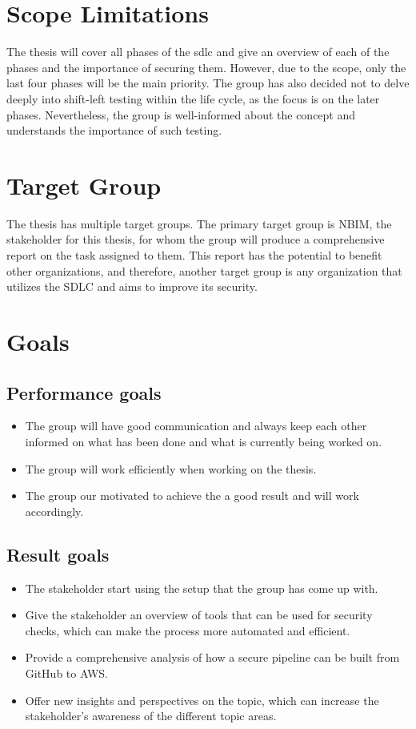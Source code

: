  
\section{Scope Limitations}
The thesis will cover all phases of the \acrlong{sdlc} and give an overview of each of the phases and the importance of securing them.  However, due to the scope, only the last four phases will be the main priority. 
The group has also decided not to delve deeply into \gls{shift-left} testing within the life cycle, as the focus is on the later phases. Nevertheless, the group is well-informed about the concept and understands the importance of such testing. 


\section{Target Group}
The thesis has multiple target groups. The primary target group is NBIM, the stakeholder for this thesis, for whom the group will produce a comprehensive report on the task assigned to them. This report has the potential to benefit other organizations, and therefore, another target group is any organization that utilizes the SDLC and aims to improve its security.

\section{Goals}
\subsection{Performance goals}
\begin{itemize}
    \item The group will have good communication and always keep each other informed on what has been done and what is currently being worked on. 
    \item The group will work efficiently when working on the thesis. 
    \item The group our motivated to achieve the a good result and will work accordingly. 
\end{itemize}

\subsection{Result goals}
\begin{itemize}
    \item The stakeholder start using the setup that the group has come up with. 
    \item Give the stakeholder an overview of tools that can be used for security checks, which can make the process more automated and efficient. 
    \item Provide a comprehensive analysis of how a secure pipeline can be built from GitHub to AWS. 
    \item Offer new insights and perspectives on the topic, which can increase the stakeholder's awareness of the different topic areas. 
\end{itemize}

